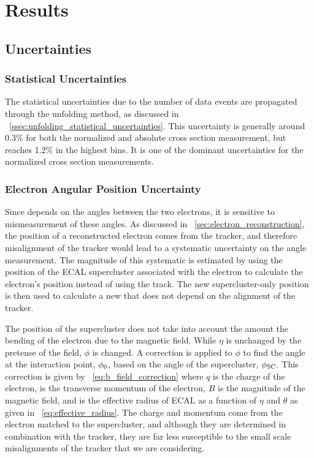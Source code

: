 \chapter{Results}
\label{chapter:results}

\section{Uncertainties}
\label{sec:uncertainties}

\subsection{Statistical Uncertainties}
\label{ssec:stat_uncertainty}

The statistical uncertainties due to the number of data events are propagated
through the unfolding method, as discussed in
\SEC~\ref{ssec:unfolding_statistical_uncertainties}. This uncertainty is
generally around 0.3\% for both the normalized and absolute cross section
measurement, but reaches 1.2\% in the highest \phistar bins. It is one of the
dominant uncertainties for the normalized cross section measurements.

\subsection{Electron Angular Position Uncertainty}

Since \phistar depends on the angles between the two electrons, it is sensitive
to mismeasurement of these angles. As discussed in
\SEC~\ref{sec:electron_reconstruction}, the position of a reconstructed
electron comes from the tracker, and therefore misalignment of the tracker
would lead to a systematic uncertainty on the angle measurement. The magnitude
of this systematic is estimated by using the position of the ECAL supercluster
associated with the electron to calculate the electron's position instead of
using the track. The new supercluster-only position is then used to calculate a
new \phistarSC that does not depend on the alignment of the tracker.

The position of the supercluster does not take into account the amount the
bending of the electron due to the magnetic field. While $\eta$ is unchanged by
the pretense of the field, $\phi$ is changed. A correction is applied to $\phi$
to find the angle at the interaction point, $\phi_{0}$, based on the angle of
the supercluster, $\phi_{\text{SC}}$. This correction is given by
\EQ~\ref{eq:b_field_correction} where $q$ is the charge of the electron, \pt is
the transverse momentum of the electron, $B$ is the magnitude of the magnetic
field, and \Reffective is the effective radius of ECAL as a function of $\eta$
and $\theta$ as given in \EQ~\ref{eq:effective_radius}. The charge and momentum
come from the electron matched to the supercluster, and although they are
determined in combination with the tracker, they are far less susceptible to
the small scale misalignments of the tracker that we are considering.

